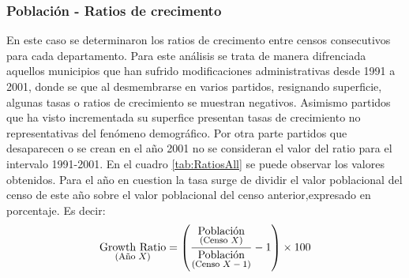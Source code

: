 \documentclass{article}
\theoremstyle{mytheoremstyle}
\theoremstyle{mytheoremstyle}
\theoremstyle{myproblemstyle}
\begin{document}
 \subsubsection{Población - Ratios de crecimento}
  En este caso se determinaron los ratios de crecimento entre censos consecutivos para cada departamento.
  Para este análisis se trata de manera difrenciada aquellos municipios que han sufrido modificaciones administrativas
  desde 1991  a 2001, donde se  que al  desmembrarse en varios partidos, resignando superficie, algunas tasas o ratios de crecimiento 
  se muestran negativos. Asimismo partidos que ha visto incrementada su superfice presentan  tasas de crecimiento no representativas del 
  fenómeno demográfico.\newline
  Por otra parte partidos que desaparecen o se crean en el año  2001 no se consideran el valor del ratio para el intervalo 1991-2001.\newline
    En el cuadro \ref{tab:RatiosAll} se puede observar los valores obtenidos. Para el año en cuestion la tasa surge de dividir el valor poblacional
  del censo de este año sobre el valor poblacional del censo anterior,expresado en porcentaje.\newline
  Es decir: \newline
  \begin{equation}
    \underset{\text{\footnotesize(Año $X$)}}{\text{Growth Ratio}} = 
    \left( \frac{\underset{\text{\footnotesize(Censo $X$)}}{\text{Población}}}{\underset{\text{\footnotesize(Censo $X-1$)}}{\text{Población}}} - 1 \right) \times 100
  \end{equation}
  \newline
\end{document}
